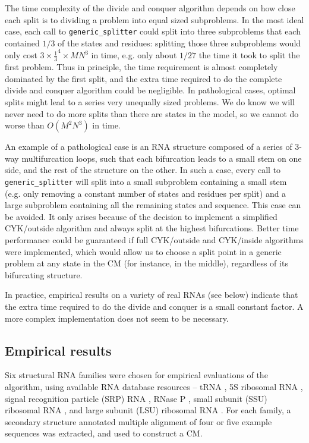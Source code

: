 \documentclass[11pt]{article}
\begin{document}
The time complexity of the divide and conquer algorithm depends on how
close each split is to dividing a problem into equal sized
subproblems. In the most ideal case, each call to
\texttt{generic\_splitter} could split into three subproblems that
each contained $1/3$ of the states and residues: splitting those three
subproblems would only cost $3 \times \frac{1}{3}^4 \times MN^3$ in
time, e.g. only about $1/27$ the time it took to split the first
problem. Thus in principle, the time requirement is almost completely
dominated by the first split, and the extra time required to do the
complete divide and conquer algorithm could be negligible. In
pathological cases, optimal splits might lead to a series very
unequally sized problems. We do know we will never need to do more
splits than there are states in the model, so we cannot do worse than
$O(M^2N^3)$ in time.

An example of a pathological case is an RNA structure composed of a
series of 3-way multifurcation loops, such that each bifurcation leads
to a small stem on one side, and the rest of the structure on the
other. In such a case, every call to \texttt{generic\_splitter} will
split into a small subproblem containing a small stem (e.g. only
removing a constant number of states and residues per split) and a
large subproblem containing all the remaining states and
sequence. This case can be avoided. It only arises because of the
decision to implement a simplified CYK/outside algorithm and always
split at the highest bifurcations. Better time performance could be
guaranteed if full CYK/outside and CYK/inside algorithms were
implemented, which would allow us to choose a split point in a generic
problem at any state in the CM (for instance, in the middle),
regardless of its bifurcating structure.

In practice, empirical results on a variety of real RNAs (see below)
indicate that the extra time required to do the divide and conquer is
a small constant factor. A more complex implementation does not seem
to be necessary.

\subsection{Empirical results}

Six structural RNA families were chosen for empirical evaluations of
the algorithm, using available RNA database resources -- tRNA
\cite{Steinberg93}, 5S ribosomal RNA \cite{Szymanski02}, signal
recognition particle (SRP) RNA \cite{Larsen91}, RNase P
\cite{Brown99}, small subunit (SSU) ribosomal RNA \cite{Neefs93}, and
large subunit (LSU) ribosomal RNA \cite{deRijk94}. For each family, a
secondary structure annotated multiple alignment of four or five
example sequences was extracted, and used to construct a CM. 
\end{document}
